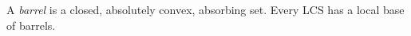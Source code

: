 A \emph{barrel} is a closed, absolutely convex, absorbing set. Every LCS has a local base of barrels.
